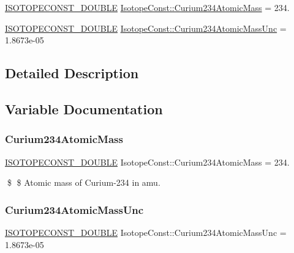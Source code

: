 \begin{DoxyCompactItemize}
\item 
\mbox{\hyperlink{group___isotope_const-_macros_ga8f45a7272ce02c0b4c65c44636ed719a}{I\+S\+O\+T\+O\+P\+E\+C\+O\+N\+S\+T\+\_\+\+D\+O\+U\+B\+LE}} \mbox{\hyperlink{group___isotope_const-_curium-_cm234_gabacec0b04f748135dcd9a896e990cfa3}{Isotope\+Const\+::\+Curium234\+Atomic\+Mass}} = 234.
\item 
\mbox{\hyperlink{group___isotope_const-_macros_ga8f45a7272ce02c0b4c65c44636ed719a}{I\+S\+O\+T\+O\+P\+E\+C\+O\+N\+S\+T\+\_\+\+D\+O\+U\+B\+LE}} \mbox{\hyperlink{group___isotope_const-_curium-_cm234_ga289cb8570da0e8bbaf9a568263913c60}{Isotope\+Const\+::\+Curium234\+Atomic\+Mass\+Unc}} = 1.\+8673e-\/05
\end{DoxyCompactItemize}


\subsection{Detailed Description}


\subsection{Variable Documentation}
\mbox{\label{group___isotope_const-_curium-_cm234_gabacec0b04f748135dcd9a896e990cfa3}} 
\subsubsection{\texorpdfstring{Curium234\+Atomic\+Mass}{Curium234AtomicMass}}
{\footnotesize\ttfamily \mbox{\hyperlink{group___isotope_const-_macros_ga8f45a7272ce02c0b4c65c44636ed719a}{I\+S\+O\+T\+O\+P\+E\+C\+O\+N\+S\+T\+\_\+\+D\+O\+U\+B\+LE}} Isotope\+Const\+::\+Curium234\+Atomic\+Mass = 234.}

\$ \$ Atomic mass of Curium-\/234 in amu. \mbox{\label{group___isotope_const-_curium-_cm234_ga289cb8570da0e8bbaf9a568263913c60}} 
\subsubsection{\texorpdfstring{Curium234\+Atomic\+Mass\+Unc}{Curium234AtomicMassUnc}}
{\footnotesize\ttfamily \mbox{\hyperlink{group___isotope_const-_macros_ga8f45a7272ce02c0b4c65c44636ed719a}{I\+S\+O\+T\+O\+P\+E\+C\+O\+N\+S\+T\+\_\+\+D\+O\+U\+B\+LE}} Isotope\+Const\+::\+Curium234\+Atomic\+Mass\+Unc = 1.\+8673e-\/05}

